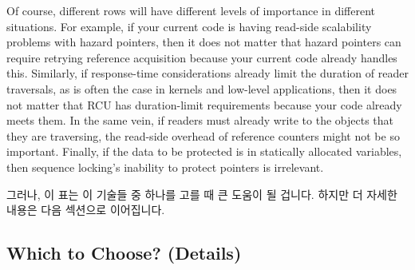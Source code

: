 Of course, different rows will have different levels of importance in
different situations.
For example, if your current code is having read-side scalability problems
with hazard pointers, then it does not matter that hazard pointers can require
retrying reference acquisition because your current code already handles
this.
Similarly, if response-time considerations already limit the duration
of reader traversals, as is often the case in kernels and low-level
applications, then it does not matter that RCU has duration-limit
requirements because your code already meets them.
In the same vein, if readers must already write to the objects that they
are traversing, the read-side overhead of reference counters might
not be so important.
Finally, if the data to be protected is in statically allocated variables,
then sequence locking's inability to protect pointers is irrelevant.
\fi

그러나, 이 표는 이 기술들 중 하나를 고를 때 큰 도움이 될 겁니다.
하지만 더 자세한 내용은 다음 섹션으로 이어집니다.
\iffalse

Nevertheless, this table should be of great help when choosing between
these techniques.
But those wishing more detail should continue on to the next section.
\fi

\subsection{Which to Choose? (Details)}
\label{sec:defer:Which to Choose? (Details)}

